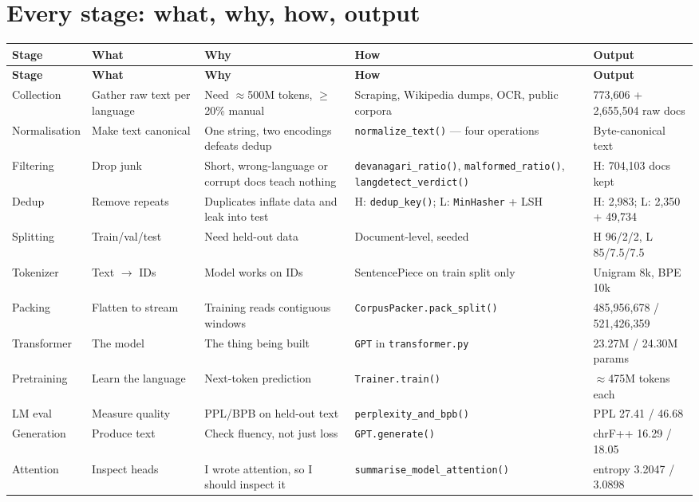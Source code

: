 \documentclass[11pt]{report}
\begin{document}
\section{Every stage: what, why, how, output}

\begin{longtable}{@{}p{2.1cm}p{2.6cm}p{3.6cm}p{3.4cm}p{3.1cm}@{}}
\toprule
\textbf{Stage} & \textbf{What} & \textbf{Why} & \textbf{How} & \textbf{Output} \\
\midrule
\endfirsthead
\toprule
\textbf{Stage} & \textbf{What} & \textbf{Why} & \textbf{How} & \textbf{Output} \\
\midrule
\endhead
Collection & Gather raw text per language & Need $\approx$500M tokens, $\ge$20\% manual & Scraping, Wikipedia dumps, OCR, public corpora & 773,606 + 2,655,504 raw docs \\
Normalisation & Make text canonical & One string, two encodings defeats dedup & \texttt{normalize\_text()} --- four operations & Byte-canonical text \\
Filtering & Drop junk & Short, wrong-language or corrupt docs teach nothing & \texttt{devanagari\_ratio()}, \texttt{malformed\_ratio()}, \texttt{langdetect\_verdict()} & H: 704,103 docs kept \\
Dedup & Remove repeats & Duplicates inflate data and leak into test & H: \texttt{dedup\_key()}; L: \texttt{MinHasher} + LSH & H: 2,983; L: 2,350 + 49,734 \\
Splitting & Train/val/test & Need held-out data & Document-level, seeded & H 96/2/2, L 85/7.5/7.5 \\
Tokenizer & Text $\rightarrow$ IDs & Model works on IDs & SentencePiece on train split only & Unigram 8k, BPE 10k \\
Packing & Flatten to stream & Training reads contiguous windows & \texttt{CorpusPacker.pack\_split()} & 485,956,678 / 521,426,359 \\
Transformer & The model & The thing being built & \texttt{GPT} in \texttt{transformer.py} & 23.27M / 24.30M params \\
Pretraining & Learn the language & Next-token prediction & \texttt{Trainer.train()} & $\approx$475M tokens each \\
LM eval & Measure quality & PPL/BPB on held-out text & \texttt{perplexity\_and\_bpb()} & PPL 27.41 / 46.68 \\
Generation & Produce text & Check fluency, not just loss & \texttt{GPT.generate()} & chrF++ 16.29 / 18.05 \\
Attention & Inspect heads & I wrote attention, so I should inspect it & \texttt{summarise\_model\_attention()} & entropy 3.2047 / 3.0898 \\

\end{longtable}
\end{document}
